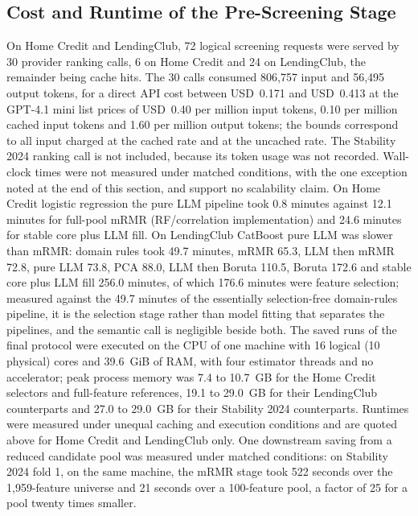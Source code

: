\documentclass[final,5p,twocolumn]{elsarticle}
\begin{document}
\subsection{Cost and Runtime of the Pre-Screening Stage}
\label{subsec:cost_runtime}

On Home Credit and LendingClub, 72 logical screening requests were served by 30 provider ranking calls, 6 on Home Credit and 24 on LendingClub, the remainder being cache hits. The 30 calls consumed 806,757 input and 56,495 output tokens, for a direct API cost between USD~0.171 and USD~0.413 at the GPT-4.1 mini list prices of USD~0.40 per million input tokens, 0.10 per million cached input tokens and 1.60 per million output tokens; the bounds correspond to all input charged at the cached rate and at the uncached rate. The Stability 2024 ranking call is not included, because its token usage was not recorded. Wall-clock times were not measured under matched conditions, with the one exception noted at the end of this section, and support no scalability claim. On Home Credit logistic regression the pure LLM pipeline took 0.8 minutes against 12.1 minutes for full-pool mRMR (RF/correlation implementation) and 24.6 minutes for stable core plus LLM fill. On LendingClub CatBoost pure LLM was slower than mRMR: domain rules took 49.7 minutes, mRMR 65.3, LLM then mRMR 72.8, pure LLM 73.8, PCA 88.0, LLM then Boruta 110.5, Boruta 172.6 and stable core plus LLM fill 256.0 minutes, of which 176.6 minutes were feature selection; measured against the 49.7 minutes of the essentially selection-free domain-rules pipeline, it is the selection stage rather than model fitting that separates the pipelines, and the semantic call is negligible beside both. The saved runs of the final protocol were executed on the CPU of one machine with 16 logical (10 physical) cores and 39.6~GiB of RAM, with four estimator threads and no accelerator; peak process memory was 7.4 to 10.7~GB for the Home Credit selectors and full-feature references, 19.1 to 29.0~GB for their LendingClub counterparts and 27.0 to 29.0~GB for their Stability 2024 counterparts. Runtimes were measured under unequal caching and execution conditions and are quoted above for Home Credit and LendingClub only. One downstream saving from a reduced candidate pool was measured under matched conditions: on Stability 2024 fold 1, on the same machine, the mRMR stage took 522 seconds over the 1,959-feature universe and 21 seconds over a 100-feature pool, a factor of 25 for a pool twenty times smaller.
\end{document}
